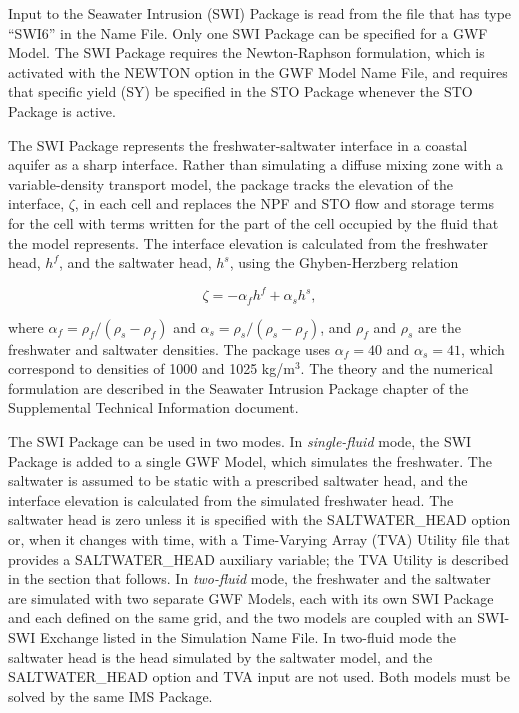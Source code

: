 Input to the Seawater Intrusion (SWI) Package is read from the file that has type ``SWI6'' in the Name File.  Only one SWI Package can be specified for a GWF Model.  The SWI Package requires the Newton-Raphson formulation, which is activated with the NEWTON option in the GWF Model Name File, and requires that specific yield (SY) be specified in the STO Package whenever the STO Package is active.

The SWI Package represents the freshwater-saltwater interface in a coastal aquifer as a sharp interface.  Rather than simulating a diffuse mixing zone with a variable-density transport model, the package tracks the elevation of the interface, $\zeta$, in each cell and replaces the NPF and STO flow and storage terms for the cell with terms written for the part of the cell occupied by the fluid that the model represents.  The interface elevation is calculated from the freshwater head, $h^f$, and the saltwater head, $h^s$, using the Ghyben-Herzberg relation

\begin{equation}
\zeta = -\alpha_f h^f + \alpha_s h^s,
\end{equation}

\noindent where $\alpha_f = \rho_f / (\rho_s - \rho_f)$ and $\alpha_s = \rho_s / (\rho_s - \rho_f)$, and $\rho_f$ and $\rho_s$ are the freshwater and saltwater densities.  The package uses $\alpha_f = 40$ and $\alpha_s = 41$, which correspond to densities of 1000 and 1025 kg/m$^3$.  The theory and the numerical formulation are described in the Seawater Intrusion Package chapter of the Supplemental Technical Information document.

The SWI Package can be used in two modes.  In \textit{single-fluid} mode, the SWI Package is added to a single GWF Model, which simulates the freshwater.  The saltwater is assumed to be static with a prescribed saltwater head, and the interface elevation is calculated from the simulated freshwater head.  The saltwater head is zero unless it is specified with the SALTWATER\_HEAD option or, when it changes with time, with a Time-Varying Array (TVA) Utility file that provides a SALTWATER\_HEAD auxiliary variable; the TVA Utility is described in the section that follows.  In \textit{two-fluid} mode, the freshwater and the saltwater are simulated with two separate GWF Models, each with its own SWI Package and each defined on the same grid, and the two models are coupled with an SWI-SWI Exchange listed in the Simulation Name File.  In two-fluid mode the saltwater head is the head simulated by the saltwater model, and the SALTWATER\_HEAD option and TVA input are not used.  Both models must be solved by the same IMS Package.

